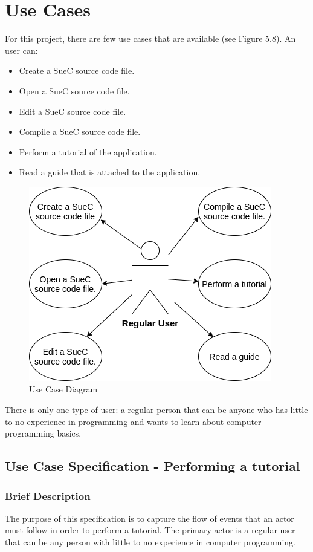 \documentclass[12pt,a4paper,twoside]{report}
\begin{document}
\section{Use Cases}
 For this project, there are few use cases that are available (see Figure 5.8). An user can:
 \begin{itemize}
 \item Create a SueC source code file.
 \item Open a SueC source code file.
 \item Edit a SueC source code file.
 \item Compile a SueC source code file.
 \item Perform a tutorial of the application.
 \item Read a guide that is attached to the application.
 \end{itemize}
 
\begin{figure}[H]
    \centering
    \includegraphics[width=0.6\linewidth]{img/UseCaseDiag.png}
    \caption{Use Case Diagram}
    \label{fig:conf}
\end{figure}

There is only one type of user: a regular person that can be anyone who has little to no experience in programming and wants to learn about computer programming basics. 

\subsection{Use Case Specification - Performing a tutorial}

\subsubsection{Brief Description}

The purpose of this specification is to capture the flow of events that an actor must follow in order to perform a tutorial. The primary actor is a regular user that can be any person with little to no experience in computer programming. 
\end{document}
